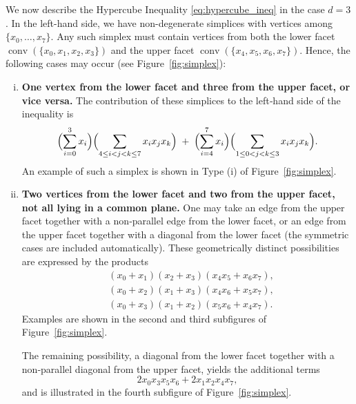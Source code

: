 \documentclass[11pt]{amsart}
\theoremstyle{definition}
\theoremstyle{remark}
\begin{document}
We now describe the Hypercube Inequality \eqref{eq:hypercube_ineq} in the case $d=3$. In the left-hand side, we have non-degenerate simplices with vertices among $\{x_0,\dots,x_7\}$. Any such simplex must contain vertices from both the lower facet $\operatorname{conv}(\{x_0,x_1,x_2,x_3\})$ and the upper facet $\operatorname{conv}(\{x_4,x_5,x_6,x_7\})$. Hence, the following cases may occur (see Figure~\ref{fig:simplex}):

\begin{enumerate}[(i): ]
    \item \textbf{One vertex from the lower facet and three from the upper facet, or vice versa.}  
    The contribution of these simplices to the left‑hand side of the inequality is
    \[
    \Bigl(\sum_{i=0}^{3} x_i\Bigr)\Bigl(\sum_{4\le i<j<k\le 7} x_i x_j x_k\Bigr)
      \;+\;
    \Bigl(\sum_{i=4}^{7} x_i\Bigr)\Bigl(\sum_{1\le 0<j<k\le 3} x_i x_j x_k\Bigr).
    \]
    An example of such a simplex is shown in Type (i) of Figure~\ref{fig:simplex}.

    \item \textbf{Two vertices from the lower facet and two from the upper facet, not all lying in a common plane.}  
    One may take an edge from the upper facet together with a non‑parallel edge from the lower facet, or an edge from the upper facet together with a diagonal from the lower facet (the symmetric cases are included automatically). These geometrically distinct possibilities are expressed by the products
\begin{align*}
&(x_0+x_1)(x_2+x_3)(x_4x_5+x_6x_7),\\
&(x_0+x_2)(x_1+x_3)(x_4x_6+x_5x_7),\\
&(x_0+x_3)(x_1+x_2)(x_5x_6+x_4x_7).
\end{align*}
    Examples are shown in the second and third subfigures of Figure~\ref{fig:simplex}.
    
    The remaining possibility, a diagonal from the lower facet together with a non‑parallel diagonal from the upper facet, yields the additional terms
    \[
    2x_0x_3x_5x_6 + 2x_1x_2x_4x_7,
    \]
    and is illustrated in the fourth subfigure of Figure~\ref{fig:simplex}.
\end{enumerate}


\end{document}
